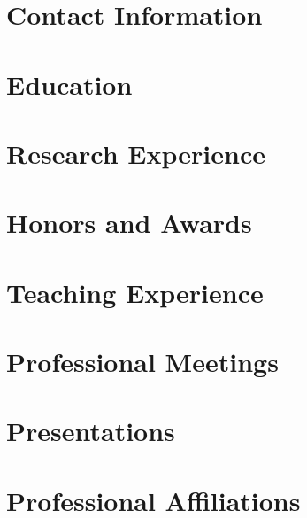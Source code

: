 \documentclass[letterpaper,10pt]{article}
\begin{document}
\section*{Contact Information}



\section*{Education}


\section*{Research Experience}

\nocite{*}



\section*{Honors and Awards}

\section*{Teaching Experience}

\section*{Professional Meetings}

\section*{Presentations}

\section*{Professional Affiliations}
\end{document}
